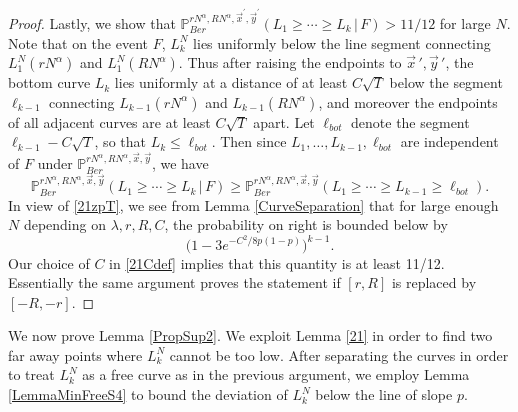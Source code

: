 \begin{proof}
		Lastly, we show that $\mathbb{P}^{rN^\alpha, RN^\alpha,\vec{x}^{\prime},\vec{y}^{\prime}}_{Ber} (L_1 \geq \cdots \geq L_k\,|\,F) > 11/12$ for large $N$. Note that on the event $F$, $L_k^N$ lies uniformly below the line segment connecting $L_1^N(rN^\alpha)$ and $L_1^N(RN^\alpha)$. Thus after raising the endpoints to $\vec{x}\,',\vec{y}\,'$, the bottom curve $L_k$ lies uniformly at a distance of at least $C\sqrt{T}$ below the segment $\ell_{k-1}$ connecting $L_{k-1}(rN^\alpha)$ and $L_{k-1}(RN^\alpha)$, and moreover the endpoints of all adjacent curves are at least $C\sqrt{T}$ apart. Let $\ell_{bot}$ denote the segment $\ell_{k-1} - C\sqrt{T}$, so that $L_k \leq \ell_{bot}$. Then since $L_1,\dots,L_{k-1},\ell_{bot}$ are independent of $F$ under $\mathbb{P}^{rN^\alpha, RN^\alpha,\vec{x},\vec{y}}_{Ber}$, we have 
		\[
		\mathbb{P}^{rN^\alpha, RN^\alpha,\vec{x},\vec{y}}_{Ber} (L_1 \geq \cdots \geq L_k\,|\,F) \geq \mathbb{P}^{rN^\alpha, RN^\alpha,\vec{x},\vec{y}}_{Ber} (L_1 \geq \cdots \geq L_{k-1} \geq \ell_{bot}).
		\]
		In view of \eqref{21zpT}, we see from Lemma \ref{CurveSeparation} that for large enough $N$ depending on $\lambda, r, R, C$, the probability on right is bounded below by
		\[
		\big(1-3e^{-C^2/8p(1-p)}\big)^{k-1}.
		\]
		Our choice of $C$ in \eqref{21Cdef} implies that this quantity is at least 11/12.\\
		
		\noindent Essentially the same argument proves the statement if $[r,R]$ is replaced by $[-R,-r]$.
		
	\end{proof}

	We now prove Lemma \ref{PropSup2}. We exploit Lemma \ref{21} in order to find two far away points where $L_k^N$ cannot be too low. After separating the curves in order to treat $L_k^N$ as a free curve as in the previous argument, we employ Lemma \ref{LemmaMinFreeS4} to bound the deviation of $L_k^N$ below the line of slope $p$.
	

